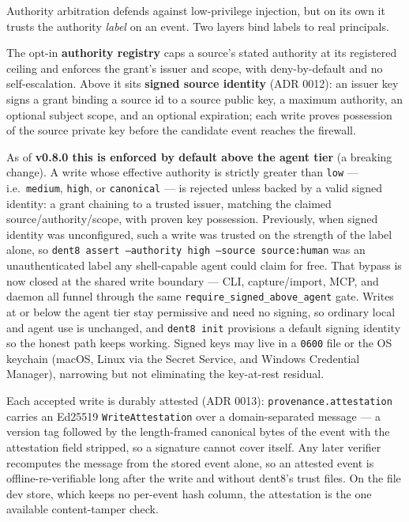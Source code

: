 \documentclass[11pt]{article}
\newcommand{\code}[1]{\texttt{#1}}
\begin{document}
Authority arbitration defends against low-privilege injection, but on its own it trusts the authority \emph{label} on an event. Two layers bind labels to real principals.

The opt-in \textbf{authority registry} caps a source's stated authority at its registered ceiling and enforces the grant's issuer and scope, with deny-by-default and no self-escalation. Above it sits \textbf{signed source identity} (ADR 0012): an issuer key signs a grant binding a source id to a source public key, a maximum authority, an optional subject scope, and an optional expiration; each write proves possession of the source private key before the candidate event reaches the firewall.

As of \textbf{v0.8.0 this is enforced by default above the agent tier} (a breaking change). A write whose effective authority is strictly greater than \code{low} --- i.e.\ \code{medium}, \code{high}, or \code{canonical} --- is rejected unless backed by a valid signed identity: a grant chaining to a trusted issuer, matching the claimed source/authority/scope, with proven key possession. Previously, when signed identity was unconfigured, such a write was trusted on the strength of the label alone, so \code{dent8 assert --authority high --source source:human} was an unauthenticated label any shell-capable agent could claim for free. That bypass is now closed at the shared write boundary --- CLI, capture/import, MCP, and daemon all funnel through the same \code{require\_signed\_above\_agent} gate. Writes at or below the agent tier stay permissive and need no signing, so ordinary local and agent use is unchanged, and \code{dent8 init} provisions a default signing identity so the honest path keeps working. Signed keys may live in a \code{0600} file or the OS keychain (macOS, Linux via the Secret Service, and Windows Credential Manager), narrowing but not eliminating the key-at-rest residual.

Each accepted write is durably attested (ADR 0013): \code{provenance.attestation} carries an Ed25519 \code{WriteAttestation} over a domain-separated message --- a version tag followed by the length-framed canonical bytes of the event with the attestation field stripped, so a signature cannot cover itself. Any later verifier recomputes the message from the stored event alone, so an attested event is offline-re-verifiable long after the write and without dent8's trust files. On the file dev store, which keeps no per-event hash column, the attestation is the one available content-tamper check.
\end{document}

